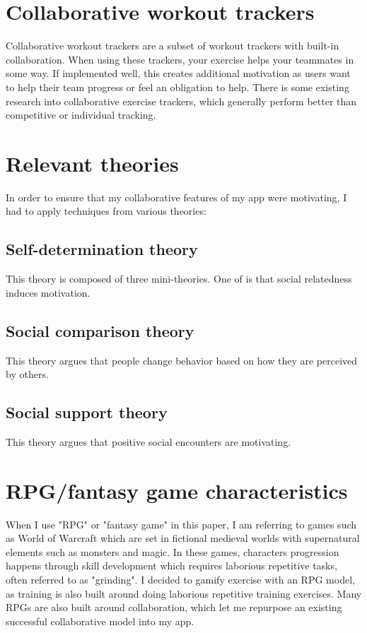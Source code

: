 \documentclass{l4proj}
\begin{document}
\section{Collaborative workout trackers}
Collaborative workout trackers are a subset of workout trackers with built-in collaboration. When using these trackers, your exercise helps your teammates in some way. If implemented well, this creates additional motivation as users want to help their team progress or feel an obligation to help. There is some existing research into collaborative exercise trackers, which generally perform better than competitive or individual tracking.

\section{Relevant theories}
In order to ensure that my collaborative features of my app were motivating, I had to apply techniques from various theories:

\subsection{Self-determination theory} 
This theory is composed of three mini-theories. One of is that social relatedness induces motivation. 

\subsection{Social comparison theory} 
This theory argues that people change behavior based on how they are perceived by others. 

\subsection{Social support theory} 
This theory argues that positive social encounters are motivating. 

\section{RPG/fantasy game characteristics}
When I use "RPG" or "fantasy game" in this paper, I am referring to games such as World of Warcraft which are set in fictional medieval worlds with supernatural elements such as monsters and magic. In these games, characters progression happens through skill development which requires laborious repetitive tasks, often referred to as "grinding". I decided to gamify exercise with an RPG model, as training is also built around doing laborious repetitive training exercises. Many RPGs are also built around collaboration, which let me repurpose an existing successful collaborative model into my app. 
\end{document}
